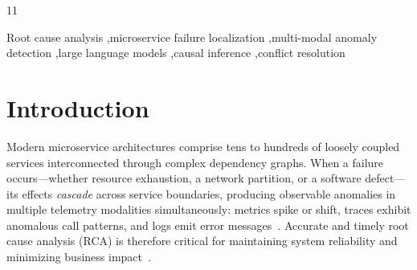 \documentclass[a4paper,fleqn]{cas-dc}
\newcommand{\sysname}{SoC\texttt{-}RCA}
\begin{document}
\begin{graphicalabstract}
\end{graphicalabstract}


\begin{highlights}
\item 11
\end{highlights}

\begin{keywords}
Root cause analysis \sep microservice failure localization \sep multi-modal anomaly detection \sep large language models \sep causal inference \sep conflict resolution
\end{keywords}


\maketitle

\section{Introduction}
\label{sec:intro}

Modern microservice architectures comprise tens to hundreds of loosely coupled services interconnected through complex dependency graphs.  When a failure occurs---whether resource exhaustion, a network partition, or a software defect---its effects \emph{cascade} across service boundaries, producing observable anomalies in multiple telemetry modalities simultaneously: metrics spike or shift, traces exhibit anomalous call patterns, and logs emit error messages~\cite{9213058,10.1145/3338906.3338961,10165686}.  Accurate and timely root cause analysis (RCA) is therefore critical for maintaining system reliability and minimizing business impact~\cite{10.1145/3715005}.
\end{document}

